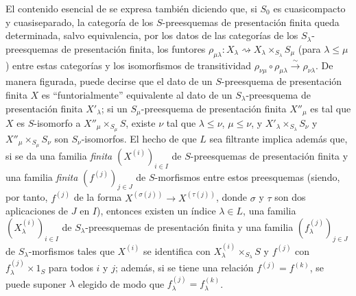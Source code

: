 \begin{env}[8.8.3]
\label{IV.8.8.3-fr}
El contenido esencial de  se expresa también diciendo que, si $S_0$ es cuasicompacto y cuasiseparado, la categoría de los $S$-preesquemas de presentación finita queda determinada, salvo equivalencia, por los datos de las categorías de los $S_\lambda$-preesquemas de presentación finita, los funtores $\rho_{\mu\lambda}:X_\lambda\rightsquigarrow
X_\lambda\times_{S_\lambda}S_\mu$ (para $\lambda\leq\mu$) entre estas categorías y los isomorfismos de transitividad $\rho_{\nu\mu}\circ\rho_{\mu\lambda}\xrightarrow{\sim}\rho_{\nu\lambda}$.
De manera figurada, puede decirse que el dato de un $S$-preesquema de presentación finita $X$ es ``funtorialmente'' equivalente al dato de un $S_\lambda$-preesquema de presentación finita $X'_\lambda$; si un $S_\mu$-preesquema de presentación finita $X''_\mu$ es tal que $X$ es $S$-isomorfo a $X''_\mu\times_{S_\mu}S$, existe $\nu$ tal que $\lambda\leq\nu$, $\mu\leq\nu$, y $X'_\lambda\times_{S_\lambda}S_\nu$ y $X''_\mu\times_{S_\mu}S_\nu$ son $S_\nu$-isomorfos.
El hecho de que $L$ sea filtrante implica además que, si se da una familia \emph{finita} $(X^{(i)})_{i\in I}$ de $S$-preesquemas de presentación finita y una familia \emph{finita} $(f^{(j)})_{j\in J}$ de $S$-morfismos entre estos preesquemas (siendo, por tanto, $f^{(j)}$ de la forma $X^{(\sigma(j))}\to X^{(\tau(j))}$, donde $\sigma$ y $\tau$ son dos aplicaciones de $J$ en $I$), entonces existen un índice $\lambda\in L$, una familia $(X_\lambda^{(i)})_{i\in I}$ de $S_\lambda$-preesquemas de presentación finita y una familia $(f_\lambda^{(j)})_{j\in J}$ de $S_\lambda$-morfismos tales que $X^{(i)}$ se identifica con $X_\lambda^{(i)}\times_{S_\lambda}S$ y $f^{(j)}$ con $f_\lambda^{(j)}\times1_S$ para todos $i$ y $j$; además, si se tiene una relación $f^{(j)}=f^{(k)}$, se puede suponer $\lambda$ elegido de modo que $f_\lambda^{(j)}=f_\lambda^{(k)}$.


\end{env}
